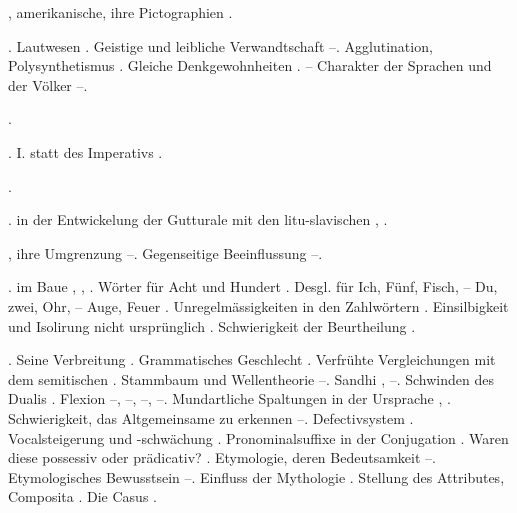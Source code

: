 \begin{register}
, amerikanische, ihre Pictographien \pageref{sp.128}.

. Lautwesen \pageref{sp.34}. Geistige und leibliche Verwandtschaft \pageref{sp.150}–\pageref{sp.151}.  Agglutination, Polysynthetismus \pageref{sp.257}. Gleiche Denkgewohnheiten \pageref{sp.293}.  \pageref{sp.354}–\pageref{sp.359} Charakter der Sprachen und der Völker \pageref{sp.423}–\pageref{sp.425}.

 \pageref{sp.173}.

 \pageref{sp.310}. I. statt des Imperativs \pageref{sp.473}.


 \pageref{sp.129}.

.  in der Entwickelung der Gutturale mit den litu-slavischen \pageref{sp.159}, \pageref{sp.163}.

, ihre Umgrenzung \pageref{sp.55}–\pageref{sp.56}. Gegenseitige Beeinflussung \pageref{sp.273}–\pageref{sp.277}.

.  im Baue \pageref{sp.149}, \pageref{sp.257}, \pageref{sp.293}. Wörter für Acht und Hundert \pageref{sp.157}. Desgl. für Ich, Fünf, Fisch, – Du, zwei, Ohr, – Auge, Feuer \pageref{sp.158}. Unregelmässigkeiten in den Zahlwörtern \pageref{sp.226}. Einsilbigkeit und Isolirung nicht ursprünglich \pageref{sp.257}. Schwierigkeit der Beurtheilung \pageref{sp.426}.

. Seine Verbreitung \pageref{sp.142}. Grammatisches Geschlecht \pageref{sp.150}. Verfrühte Vergleichungen mit dem semitischen \pageref{sp.162}. Stammbaum und Wellentheorie \pageref{sp.163}–\pageref{sp.165}.  Sandhi \pageref{sp.198}, \pageref{sp.401}–\pageref{sp.402}. Schwinden des Dualis \pageref{sp.253}. Flexion \pageref{sp.256}–\pageref{sp.257}, \sed{\pageref{sp.251}}\edins{{\textbar}{\textbar}\pageref{sp.351}}–\pageref{sp.354}, \pageref{sp.398}–\pageref{sp.401}, \pageref{sp.435}–\pageref{sp.436}. Mundartliche Spaltungen in der Ursprache \pageref{sp.284}, \pageref{sp.285}. Schwierigkeit, das Altgemeinsame zu erkennen \pageref{sp.293}–\pageref{sp.294}. Defectivsystem \pageref{sp.352}. Vocalsteigerung und -schwächung \pageref{sp.352}. Pronominalsuffixe in der Conjugation \pageref{sp.372}.  Waren diese possessiv oder prädicativ? \pageref{sp.391}. Etymologie, deren Bedeutsamkeit \pageref{sp.395}–\pageref{sp.398}. Etymologisches Bewusstsein \pageref{sp.403}–\pageref{sp.404}.  Einfluss der Mythologie \pageref{sp.447}. Stellung des Attributes, Composita \pageref{sp.457}. Die Casus \pageref{sp.462}.


\end{register}
